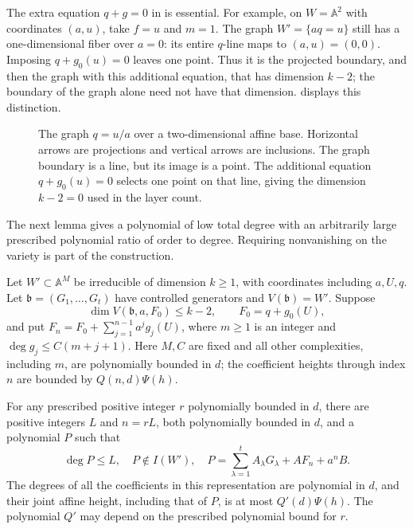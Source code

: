 The extra equation $q+g=0$ in  is essential.
For example, on $W=\mathbb A^2$ with coordinates $(a,u)$, take $f=u$
and $m=1$.  The graph $W'=\{aq=u\}$ still has a one-dimensional
fiber over $a=0$: its entire $q$-line maps to $(a,u)=(0,0)$.
Imposing $q+g_0(u)=0$ leaves one point.  Thus it is the projected
boundary, and then the graph with this additional equation, that has
dimension $k-2$; the boundary of the graph alone need not have that
dimension.   displays this distinction.

\begin{figure}[H]
\centering

\caption{The graph $q=u/a$ over a two-dimensional affine base.
Horizontal arrows are projections and vertical arrows are inclusions.
The graph boundary is a line, but its image is a point.  The additional
equation $q+g_0(u)=0$ selects one point on that line, giving the
dimension $k-2=0$ used in the layer count.}
\label{fig:graph-projection}
\end{figure}

The next lemma gives a polynomial of low total degree with an arbitrarily
large prescribed polynomial ratio of order to degree.  Requiring
nonvanishing on the variety is part of the construction.

\begin{lemma}\label{lem:layer-interpolation}
Let $W'\subset\mathbb A^M$ be irreducible of dimension $k\geq1$,
with coordinates including $a,U,q$.  Let $\mathfrak b=(G_1,\ldots,G_t)$
have controlled generators and $V(\mathfrak b)=W'$.  Suppose
\[
 \dim V(\mathfrak b,a,F_0)\leq k-2,
 \qquad F_0=q+g_0(U),
\]
and put $F_n=F_0+\sum_{j=1}^{n-1}a^j g_j(U)$, where $m\ge1$ is an
integer and $\deg g_j\leq C(m+j+1)$.  Here $M,C$ are fixed and all other
complexities, including $m$, are polynomially bounded in $d$; the
coefficient heights through index $n$ are bounded by
$Q(n,d)\Psi(h)$.

For any prescribed positive integer $r$ polynomially bounded in $d$,
there are positive integers $L$ and $n=rL$, both polynomially bounded
in $d$, and a polynomial $P$ such that
\begin{equation}\label{eq:layer-membership}
 \deg P\leq L,\quad P\notin I(W'),\quad
 P=\sum_{\lambda=1}^t A_\lambda G_\lambda+A F_n+a^n B.
\end{equation}
The degrees of all the coefficients in this representation are
polynomial in $d$, and their joint affine height, including that of $P$,
is at most $Q'(d)\Psi(h)$.  The polynomial $Q'$ may depend on the
prescribed polynomial bound for $r$.
\end{lemma}

